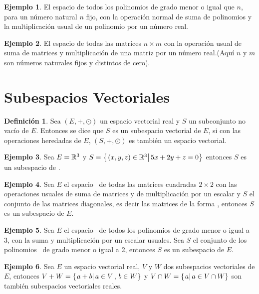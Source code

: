 \documentclass[10pt,a4paper]{report}
\theoremstyle{definition}
\newtheorem{dfn}{Definición}[chapter]
\newtheorem{ejemplo}{Ejemplo}[chapter]
\theoremstyle{remark}
\numberwithin{section}{chapter}
\numberwithin{equation}{chapter}
\numberwithin{tacounter}{chapter}
\begin{document}
\begin{ejemplo}
El espacio de todos los polinomios de grado menor o igual que $n$, para un número natural $n$ fijo, con la operación normal de suma de polinomios y la multiplicación usual de un polinomio por un número real.
\end{ejemplo}

\begin{ejemplo}
El espacio de todas las matrices $n \times m$ con la operación usual de suma de matrices y multiplicación de una matriz por un número real.(Aquí $n$ y $m$ son números naturales fijos y distintos de cero).


\end{ejemplo}

\section{Subespacios Vectoriales}
\begin{dfn}
Sea $(E, +, \odot)$ un espacio vectorial real y $S$ un subconjunto no vacío de $E$. Entonces se dice que $S$ es un subespacio vectorial de $E$, si con las operaciones heredadas de $E$, $(S, +, \odot)$ es también un espacio vectorial.

\end{dfn}

\begin{ejemplo}
Sea $E = \mathbb{R}^3$ y $S = \left\{ \left. (x, y, z) \in \mathbb{R}^3\right| 5x + 2y + z = 0 \right\}$ entonces $S$ es un subespacio de \rtres.
\end{ejemplo}

\begin{ejemplo}
Sea $E$ el espacio \mdosxdos \ de todas las matrices cuadradas $2 \times 2$ con las operaciones usuales de suma de matrices y de multiplicación por un escalar y $S$ el conjunto de las matrices diagonales, es decir las matrices de la forma , entonces $S$ es un subespacio de $E$.

\end{ejemplo}

\begin{ejemplo}
Sea $E$ el espacio \ptres \ de todos los polinomios de grado menor o igual a 3, con la suma y multiplicación por un escalar usuales. Sea $S$ el conjunto de los polinomios \pdos \ de grado menor o igual a 2, entonces $S$ es un subespacio de $E$.
\end{ejemplo}

\begin{ejemplo}

Sea $E$ un espacio vectorial real, $V$ y $W$ dos subespacios vectoriales de $E$, entonces $V + W =\left\{ \left. a+b\right| a \in V \, , \, b \in W \right\}$ y $V \cap W = \left\{ \left. a\right| a \in V \cap W \right\}$ son también subespacios vectoriales reales.
\end{ejemplo}
\end{document}
